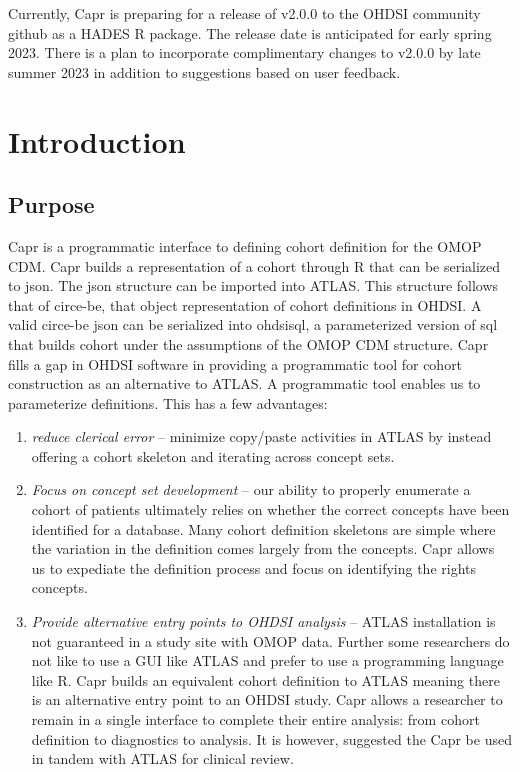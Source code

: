 \documentclass[
]{article}
\providecommand{\tightlist}{%
  \setlength{\itemsep}{0pt}\setlength{\parskip}{0pt}}
\begin{document}
Currently, Capr is preparing for a release of v2.0.0 to the OHDSI
community github as a HADES R package. The release date is anticipated
for early spring 2023. There is a plan to incorporate complimentary
changes to v2.0.0 by late summer 2023 in addition to suggestions based
on user feedback.

\section{Introduction}\label{introduction}

\subsection{Purpose}\label{purpose}

Capr is a programmatic interface to defining cohort definition for the
OMOP CDM. Capr builds a representation of a cohort through R that can be
serialized to json. The json structure can be imported into ATLAS. This
structure follows that of circe-be, that object representation of cohort
definitions in OHDSI. A valid circe-be json can be serialized into
ohdsisql, a parameterized version of sql that builds cohort under the
assumptions of the OMOP CDM structure. Capr fills a gap in OHDSI
software in providing a programmatic tool for cohort construction as an
alternative to ATLAS. A programmatic tool enables us to parameterize
definitions. This has a few advantages:

\begin{enumerate}
\def\labelenumi{\arabic{enumi}.}
\tightlist
\item
  \emph{reduce clerical error} -- minimize copy/paste activities in
  ATLAS by instead offering a cohort skeleton and iterating across
  concept sets.
\item
  \emph{Focus on concept set development} -- our ability to properly
  enumerate a cohort of patients ultimately relies on whether the
  correct concepts have been identified for a database. Many cohort
  definition skeletons are simple where the variation in the definition
  comes largely from the concepts. Capr allows us to expediate the
  definition process and focus on identifying the rights concepts.
\item
  \emph{Provide alternative entry points to OHDSI analysis} -- ATLAS
  installation is not guaranteed in a study site with OMOP data. Further
  some researchers do not like to use a GUI like ATLAS and prefer to use
  a programming language like R. Capr builds an equivalent cohort
  definition to ATLAS meaning there is an alternative entry point to an
  OHDSI study. Capr allows a researcher to remain in a single interface
  to complete their entire analysis: from cohort definition to
  diagnostics to analysis. It is however, suggested the Capr be used in
  tandem with ATLAS for clinical review.
\end{enumerate}
\end{document}

